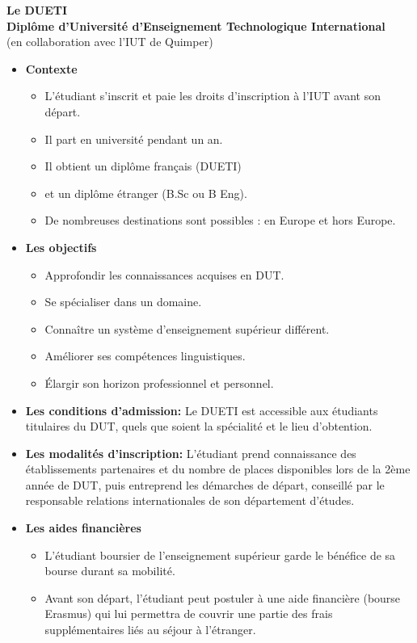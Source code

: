 \documentclass[11pt]{article}
\begin{document}
\begin{center}
\textbf{Le DUETI\\
Diplôme d'Université d'Enseignement Technologique International}\\
(en collaboration avec l'IUT de Quimper)
\vspace*{1cm}
\end{center}
\renewcommand{\labelitemi}{\footnotesize $\blacksquare$}
\begin{itemize}
\itemsep 0.5cm
\item \textbf{Contexte}
\begin{itemize}
\item L'étudiant s'inscrit et paie les droits d'inscription à l'IUT avant son départ.
\item Il part en université pendant un an.
\item Il obtient un diplôme français (DUETI)
\item et un diplôme étranger (B.Sc ou B Eng).
\item De nombreuses destinations sont possibles : en Europe et hors Europe.
\end{itemize}
\item \textbf{Les objectifs}
\begin{itemize}
\item Approfondir les connaissances acquises en DUT.
\item Se spécialiser dans un domaine.
\item Connaître un système d'enseignement supérieur différent.
\item Améliorer ses compétences linguistiques.
\item Élargir son horizon professionnel et personnel.
\end{itemize}
\item \textbf{Les conditions d'admission: }Le DUETI est accessible aux étudiants titulaires du DUT, quels que soient la spécialité et le lieu d'obtention.

\item \textbf{Les modalités d'inscription:} L'étudiant prend connaissance des établissements partenaires et du nombre de places disponibles lors de la 2ème année de DUT, puis entreprend les démarches de départ, conseillé par le responsable relations internationales de son département d'études.
\item \textbf{Les aides financières}
\begin{itemize}
\item L'étudiant boursier de l'enseignement supérieur garde le bénéfice de sa bourse durant sa mobilité.
\item Avant son départ, l'étudiant peut postuler à une aide financière (bourse Erasmus) qui lui permettra de couvrir une partie des frais supplémentaires liés au séjour à l'étranger.
\end{itemize}


\end{itemize}
\end{document}
